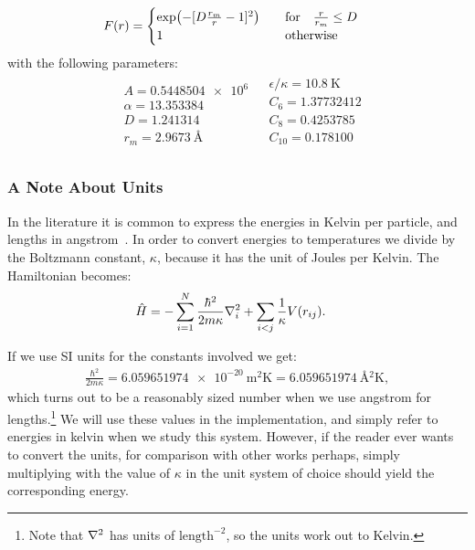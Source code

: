 \documentclass[Thesis.tex]{subfiles}
\begin{document}
\begin{align}
    F(r) &= \begin{cases}
        \exp( - [D \frac{r_m}{r} -  1]^2 ) & \qfor \frac{r}{r_m} \leq D\\
        1 & \qotherwise
    \end{cases}
\end{align}
with the following parameters:
\begin{align}\label{eq:HFDHE2-parameters}
    \begin{split}
        &A = \num{0.5448504e6}\\
        &\alpha = \num{13.353384}\\
        &D = \num{1.241314}\\
        &r_m= \SI{2.9673}{\angstrom}
    \end{split}
    \begin{split}
        &\epsilon/\kappa = \SI{10.8}{\K}\\
        &C_6= \num{1.37732412}\\
        &C_8= \num{0.4253785}\\
        &C_{10}= \num{0.178100}\\
    \end{split}
\end{align}

\subsubsection{A Note About Units}

In the literature it is common to express the energies in Kelvin per particle,
and lengths in angstrom~\cite{Kalos-1981, Aziz-hfdhe2, ruggeri2018}. In order to convert energies to temperatures we
divide by the Boltzmann constant, $\kappa$, because it has the unit of Joules per
Kelvin. The Hamiltonian becomes:
\begin{align}
  \hat H &= -\sum_{i=1}^N \frac{\hbar^2}{2m\kappa}\laplacian_i + \sum_{i<j}\frac{1}{\kappa}V(r_{ij}).
\end{align}

If we use SI units for the constants involved we get:
\begin{align}
  \frac{\hbar^2}{2m\kappa} = \SI{6.059651974e-20}{\metre^2\kelvin} = \SI{6.059651974}{\angstrom^2\kelvin},
\end{align}
which turns out to be a reasonably sized number when we use angstrom for
lengths.\footnote{Note that $\laplacian$ has units of $\text{length}^{-2}$, so
  the units work out to Kelvin.} We will use these values in the implementation,
and simply refer to energies in kelvin when we study this system. However, if
the reader ever wants to convert the units, for comparison with other works
perhaps, simply multiplying with the value of $\kappa$ in the unit system of
choice should yield the corresponding energy.
\end{document}
